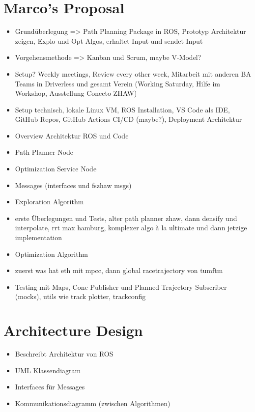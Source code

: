 \section{Marco's Proposal}
\begin{itemize}
    \item Grundüberlegung => Path Planning Package in ROS, Prototyp Architektur zeigen, Explo und Opt Algos, erhaltet Input und sendet Input
    \item Vorgehensmethode => Kanban und Scrum, maybe V-Model?
    \item Setup? Weekly meetings, Review every other week, Mitarbeit mit anderen BA Teams in Driverless und gesamt Verein (Working Saturday, Hilfe im Workshop, Ausstellung Conecto ZHAW)
    \item Setup technisch, lokale Linux VM, ROS Installation, VS Code als IDE, GitHub Repos, GitHub Actions CI/CD (maybe?), Deployment Architektur
    \item Overview Architektur ROS und Code
    \item Path Planner Node
    \item Optimization Service Node
    \item Messages (interfaces und fszhaw msgs)
    \item Exploration Algorithm
    \item erste Überlegungen und Tests, alter path planner zhaw, dann densify und interpolate, rrt max hamburg, komplexer algo à la ultimate und dann jetzige implementation
    \item Optimization Algorithm
    \item zuerst was hat eth mit mpcc, dann global racetrajectory von tumftm
    \item Testing mit Maps, Cone Publisher und Planned Trajectory Subscriber (mocks), utils wie track plotter, trackconfig
\end{itemize}

\section{Architecture Design}
\begin{itemize}
    \item Beschreibt Architektur von ROS
    \item UML Klassendiagram
    \item Interfaces für Messages
    \item Kommunikationsdiagramm (zwischen Algorithmen)
\end{itemize}

